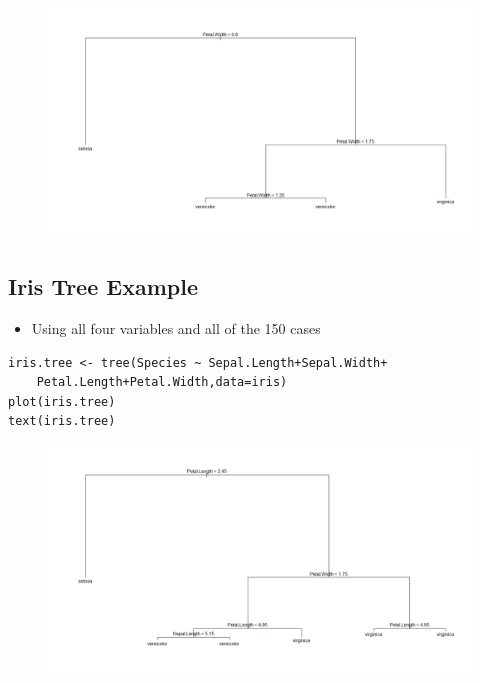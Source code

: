 \documentclass[caret-main.tex]{subfiles}
\begin{document}
\begin{itemize}
\begin{figure}[h!]
\centering
\includegraphics[width=0.99\linewidth]{./irispwtree}
\caption{}
\label{fig:irispwtree}
\end{figure}

\end{itemize}
\newpage
\subsection{Iris Tree Example}
\begin{itemize}
\item Using all four variables and all of the 150 cases
\end{itemize}

\begin{framed}
\begin{verbatim}
iris.tree <- tree(Species ~ Sepal.Length+Sepal.Width+
	Petal.Length+Petal.Width,data=iris)
plot(iris.tree)
text(iris.tree)

\end{verbatim}
\end{framed}

\begin{figure}[h!]
\centering
\includegraphics[width=0.8\linewidth]{./iristree1}
\caption{}
\label{fig:iristree1}
\end{figure}
\end{document}
